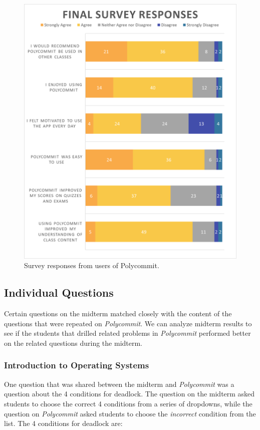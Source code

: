  \begin{figure}
	\includegraphics[width=1.0\linewidth]{figures/likert}
	\caption{Survey responses from users of Polycommit.}
	\label{fig:likert}
\end{figure}


\subsection{Individual Questions}
Certain questions on the midterm matched closely with the content of the questions that were repeated on \textit{Polycommit}. We can analyze midterm results to see if the students that drilled related problems in \textit{Polycommit} performed better on the related questions during the midterm.

\subsubsection{Introduction to Operating Systems}
One question that was shared between the midterm and \textit{Polycommit} was a question about the 4 conditions for deadlock. The question on the midterm asked students to choose the correct 4 conditions from a series of dropdowns, while the question on \textit{Polycommit} asked students to choose the \textit{incorrect} condition from the list. The 4 conditions for deadlock are:

